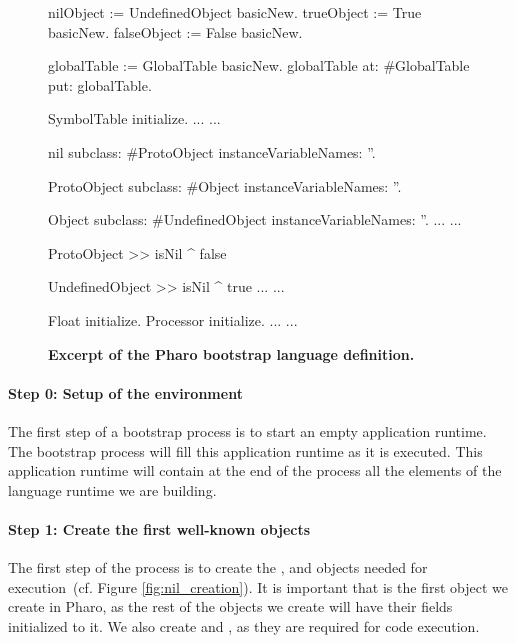 \begin{figure}[ht]
\begin{code}
nilObject := UndefinedObject basicNew.
trueObject := True basicNew.
falseObject := False basicNew.

globalTable := GlobalTable basicNew.
globalTable
    at: #GlobalTable
    put: globalTable.
    
SymbolTable initialize.
...
...

nil subclass: #ProtoObject
    instanceVariableNames: ''.

ProtoObject subclass: #Object
    instanceVariableNames: ''.
    
Object subclass: #UndefinedObject
    instanceVariableNames: ''.
...
...

ProtoObject >> isNil
   ^ false

UndefinedObject >> isNil
   ^ true
...
...
    
Float initialize.
Processor initialize.
...
...
\end{code}
\caption{\textbf{Excerpt of the Pharo bootstrap language definition.}\label{fig:example_language_definition}}
\end{figure}

\paragraph{Step 0: Setup of the environment} The first step of a bootstrap process is to start an empty application runtime. The bootstrap process will fill this application runtime as it is executed. This application runtime will contain at the end of the process all the elements of the language runtime we are building.

\paragraph{\textbf{Step 1: Create the first well-known objects}}\label{sec:create_nil}

The first step of the process is to create the ,  and  objects needed for execution~(cf. Figure \ref{fig:nil_creation}). It is important that  is the first object we create in Pharo, as the rest of the objects we create will have their fields initialized to it. We also create  and , as they are required for code execution.


